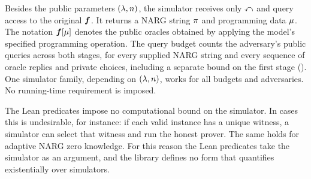 \begin{definition}
  Besides the public parameters \((\lambda,n)\), the simulator receives only \(\mathbb{x}\) and query access to the original \(\boldsymbol{f}\). It returns a NARG string \(\pi\) and programming data \(\mu\). The notation \(\boldsymbol{f}[\mu]\) denotes the public oracles obtained by applying the model's specified programming operation. The query budget counts the adversary's public queries across both stages, for every supplied NARG string and every sequence of oracle replies and private choices, including a separate bound on the first stage (). One simulator family, depending on \((\lambda,n)\), works for all budgets and adversaries. No running-time requirement is imposed.

  \leanok
\end{definition}

\begin{remark}[Limitations]
  \label{rem:zk_unrestricted_simulation}
  The Lean predicates impose no computational bound on the simulator. In cases this is undesirable, for instance: if each valid instance has a unique witness, a simulator can select that witness and run the honest prover. The same holds for adaptive NARG zero knowledge. For this reason the Lean predicates take the simulator as an argument, and the library defines no form that quantifies existentially over simulators.
  \leanok
\end{remark}
